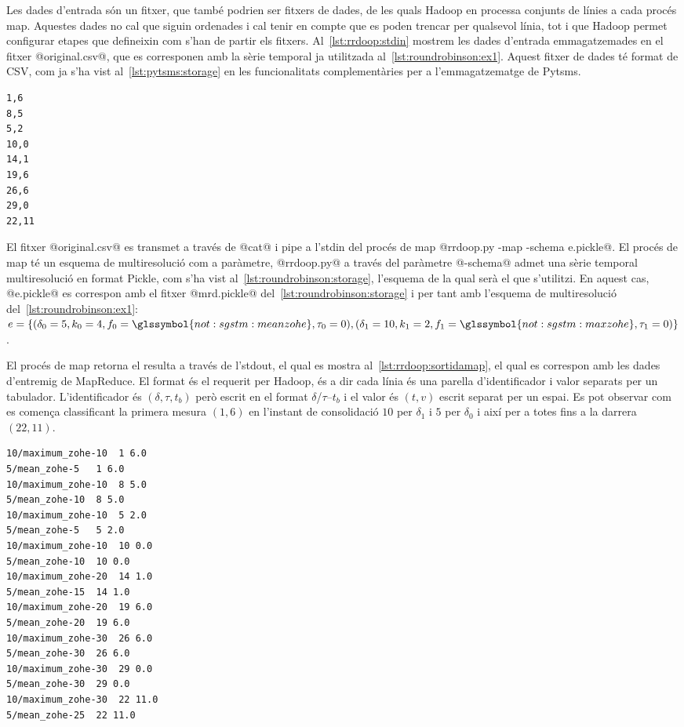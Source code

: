 Les dades d'entrada són un fitxer, que també podrien ser fitxers de
dades, de les quals Hadoop en processa conjunts de línies a cada
procés map.  Aquestes dades no cal que siguin ordenades i cal tenir en
compte que es poden trencar per qualsevol línia, tot i que Hadoop
permet configurar etapes que defineixin com s'han de partir els
fitxers.  Al~\autoref{lst:rrdoop:stdin} mostrem les dades d'entrada
emmagatzemades en el fitxer @original.csv@, que es corresponen
amb la sèrie temporal ja utilitzada
al~\autoref{lst:roundrobinson:ex1}.  Aquest fitxer de dades té format
de \gls{CSV}, com ja s'ha vist al~\autoref{lst:pytsms:storage} en les
funcionalitats complementàries per a l'emmagatzematge de Pytsms.
\begin{lstlisting}[style=file,caption=Dades d'entrada @original.csv@,label=lst:rrdoop:stdin]
1,6
8,5
5,2
10,0
14,1
19,6
26,6
29,0
22,11
\end{lstlisting}


El fitxer @original.csv@ es transmet a través de @cat@ i pipe a
l'stdin del procés de map %
@rrdoop.py -map -schema e.pickle@.  El procés de map té un esquema de
multiresolució com a paràmetre, @rrdoop.py@ a través del paràmetre
@-schema@ admet una sèrie temporal multiresolució en format Pickle,
com s'ha vist al~\autoref{lst:roundrobinson:storage}, l'esquema de la
qual serà el que s'utilitzi. En aquest cas, @e.pickle@ es correspon
amb el fitxer @mrd.pickle@ del~\autoref{lst:roundrobinson:storage} i
per tant amb l'esquema de multiresolució
del~\autoref{lst:roundrobinson:ex1}:
$e=\{(\delta_0=5,k_0=4,f_0=\glssymbol{not:sgstm:meanzohe},\tau_0=0),(\delta_1=10,k_1=2,f_1=\glssymbol{not:sgstm:maxzohe},\tau_1=0)\}$.

El procés de map retorna el resulta a través de l'stdout, el qual es mostra
al~\autoref{lst:rrdoop:sortidamap}, el qual es correspon amb les dades
d'entremig de MapReduce. El format és el requerit per Hadoop, és a dir
cada línia és una parella d'identificador i valor separats per un
tabulador. L'identificador és $(\delta,\tau,t_b)$ però escrit en el
format $\delta$/$\tau$--$t_b$ i el valor és $(t,v)$ escrit separat per
un espai. Es pot observar com es comença classificant la primera
mesura $(1,6)$ en l'instant de consolidació $10$ per $\delta_1$ i $5$
per $\delta_0$ i així per a totes fins a la darrera $(22,11)$.
\begin{lstlisting}[style=stdout,caption=Sortida del procés map,label=lst:rrdoop:sortidamap]
10/maximum_zohe-10	1 6.0
5/mean_zohe-5	1 6.0
10/maximum_zohe-10	8 5.0
5/mean_zohe-10	8 5.0
10/maximum_zohe-10	5 2.0
5/mean_zohe-5	5 2.0
10/maximum_zohe-10	10 0.0
5/mean_zohe-10	10 0.0
10/maximum_zohe-20	14 1.0
5/mean_zohe-15	14 1.0
10/maximum_zohe-20	19 6.0
5/mean_zohe-20	19 6.0
10/maximum_zohe-30	26 6.0
5/mean_zohe-30	26 6.0
10/maximum_zohe-30	29 0.0
5/mean_zohe-30	29 0.0
10/maximum_zohe-30	22 11.0
5/mean_zohe-25	22 11.0
\end{lstlisting}


